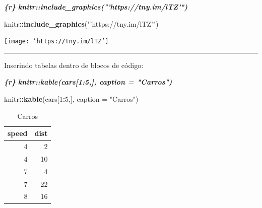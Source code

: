 \documentclass[
]{book}
\newenvironment{Shaded}{\begin{snugshade}}{\end{snugshade}}
\newcommand{\DataTypeTok}[1]{\textcolor[rgb]{0.13,0.29,0.53}{#1}}
\newcommand{\DecValTok}[1]{\textcolor[rgb]{0.00,0.00,0.81}{#1}}
\newcommand{\InformationTok}[1]{\textcolor[rgb]{0.56,0.35,0.01}{\textbf{\textit{#1}}}}
\newcommand{\KeywordTok}[1]{\textcolor[rgb]{0.13,0.29,0.53}{\textbf{#1}}}
\newcommand{\NormalTok}[1]{#1}
\newcommand{\OperatorTok}[1]{\textcolor[rgb]{0.81,0.36,0.00}{\textbf{#1}}}
\newcommand{\StringTok}[1]{\textcolor[rgb]{0.31,0.60,0.02}{#1}}
\begin{document}
\begin{Shaded}
\begin{Highlighting}[]
\InformationTok{\textasciigrave{}\textasciigrave{}\textasciigrave{}\{r\}}
\InformationTok{knitr::include\_graphics("'https://tny.im/lTZ'")}
\InformationTok{\textasciigrave{}\textasciigrave{}\textasciigrave{}}
\end{Highlighting}
\end{Shaded}

\begin{Shaded}
\begin{Highlighting}[]
\NormalTok{knitr}\OperatorTok{::}\KeywordTok{include\_graphics}\NormalTok{(}\StringTok{"'https://tny.im/lTZ'"}\NormalTok{)}
\end{Highlighting}
\end{Shaded}

\texttt{[image: 'https://tny.im/lTZ']}

\begin{center}\rule{0.5\linewidth}{0.5pt}\end{center}

Inserindo tabelas dentro de blocos de código:

\begin{Shaded}
\begin{Highlighting}[]
\InformationTok{\textasciigrave{}\textasciigrave{}\textasciigrave{}\{r\}}
\InformationTok{knitr::kable(cars[1:5,], caption = "Carros")}
\InformationTok{\textasciigrave{}\textasciigrave{}\textasciigrave{}}
\end{Highlighting}
\end{Shaded}

\begin{Shaded}
\begin{Highlighting}[]
\NormalTok{knitr}\OperatorTok{::}\KeywordTok{kable}\NormalTok{(cars[}\DecValTok{1}\OperatorTok{:}\DecValTok{5}\NormalTok{,], }\DataTypeTok{caption =} \StringTok{"Carros"}\NormalTok{)}
\end{Highlighting}
\end{Shaded}

\begin{table}

\caption{\label{tab:unnamed-chunk-11}Carros}
\centering
\begin{tabular}[t]{r|r}
\hline
speed & dist\\
\hline
4 & 2\\
\hline
4 & 10\\
\hline
7 & 4\\
\hline
7 & 22\\
\hline
8 & 16\\
\hline
\end{tabular}
\end{table}
\end{document}
